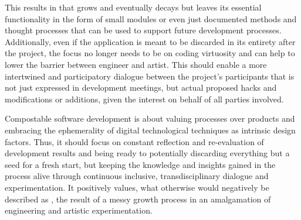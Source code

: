 This results in  that grows and eventually decays but leaves its essential functionality in the form of small modules or even just documented methods and thought processes that can be used to support future development processes. Additionally, even if the application is meant to be discarded in its entirety after the project, the focus no longer needs to be on coding virtuosity and can help to lower the barrier between engineer and artist. This should enable a more intertwined and participatory dialogue between the project's participants that is not just expressed in development meetings, but actual proposed hacks and modifications or additions, given the interest on behalf of all parties involved.

Compostable software development is about valuing processes over products and embracing the ephemerality of digital technological techniques as intrinsic design factors. Thus, it should focus on constant reflection and re-evaluation of development results and being ready to potentially discarding everything but a seed for a fresh start, but keeping the knowledge and insights gained in the process alive through continuous inclusive, transdisciplinary dialogue and experimentation. It positively values, what otherwise would negatively be described as , the result of a messy growth process in an amalgamation of engineering and artistic experimentation.
